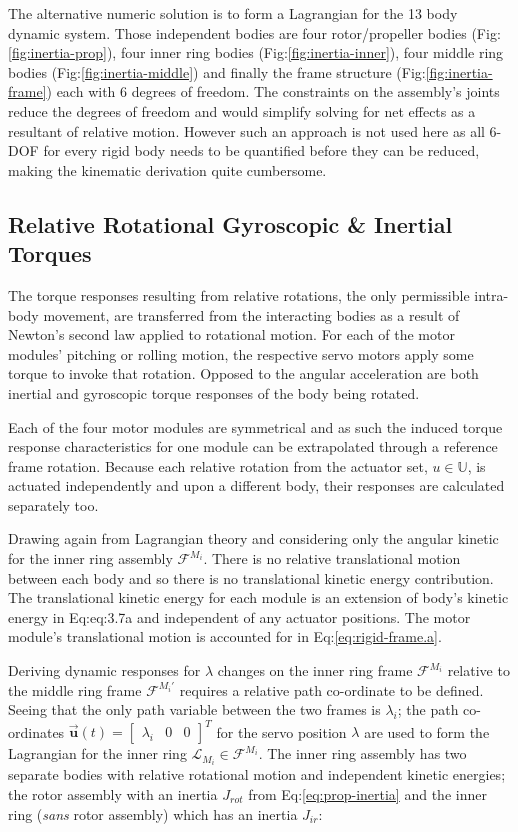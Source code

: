The alternative numeric solution is to form a Lagrangian for the 13 body dynamic system. Those independent bodies are four rotor/propeller bodies (Fig:\ref{fig:inertia-prop}), four inner ring bodies (Fig:\ref{fig:inertia-inner}), four middle ring bodies (Fig:\ref{fig:inertia-middle}) and finally the frame structure (Fig:\ref{fig:inertia-frame}) each with 6 degrees of freedom. The constraints on the assembly's joints reduce the degrees of freedom and would simplify solving for net effects as a resultant of relative motion. However such an approach is not used here as all 6-DOF for every rigid body needs to be quantified before they can be reduced, making the kinematic derivation quite cumbersome.
\subsection{Relative Rotational Gyroscopic \& Inertial Torques}
\label{subsec:dynamics.nonlinearities.gyrotorques}
The torque responses resulting from relative rotations, the only permissible intra-body movement, are transferred from the interacting bodies as a result of Newton's second law applied to rotational motion. For each of the motor modules' pitching or rolling motion, the respective servo motors apply some torque to invoke that rotation. Opposed to the angular acceleration are both inertial and gyroscopic torque responses of the body being rotated.
\par
Each of the four motor modules are symmetrical and as such the induced torque response characteristics for one module can be extrapolated through a reference frame rotation. Because each relative rotation from the actuator set, $u\in\mathbb{U}$, is actuated independently and upon a different body, their responses are calculated separately too.
\par
Drawing again from Lagrangian theory and considering only the angular kinetic for the inner ring assembly $\mathcal{F}^{M_i}$. There is no relative translational motion between each body and so there is no translational kinetic energy contribution. The translational kinetic energy for each module is an extension of body's kinetic energy in Eq:{eq:3.7a} and independent of any actuator positions. The motor module's translational motion is accounted for in Eq:\ref{eq:rigid-frame.a}. 
\par
Deriving dynamic responses for $\lambda$ changes on the inner ring frame $\mathcal{F}^{M_i}$ relative to the middle ring frame $\mathcal{F}^{M_i'}$ requires a relative path co-ordinate to be defined. Seeing that the only path variable between the two frames is $\lambda_i$; the path co-ordinates $\vec{\mathbf{u}}(t)=\begin{bmatrix}\lambda_i&0&0\end{bmatrix}^T$ for the servo position $\lambda$ are used to form the Lagrangian for the inner ring $\mathcal{L}_{M_i}\in\mathcal{F}^{M_i}$. The inner ring assembly has two separate bodies with relative rotational motion and independent kinetic energies; the rotor assembly with an inertia $J_{rot}$ from Eq:\ref{eq:prop-inertia} and the inner ring (\emph{sans} rotor assembly) which has an inertia $J_{ir}$:
